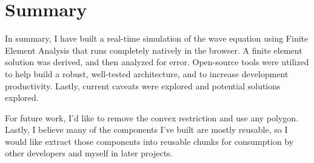 \section{Summary}
In summary, I have built a real-time simulation of the wave equation using Finite Element Analysis that runs completely
natively in the browser. A finite element solution was derived, and then analyzed for error. Open-source tools were
utilized to help build a robust, well-tested architecture, and to increase development productivity. Lastly, current
caveats were explored and potential solutions explored.

For future work, I'd like to remove the convex restriction and use any polygon. Lastly, I believe many of the components I've built are mostly reusable,
so I would like extract those components into reusable chunks for consumption by other developers and myself in later
projects.
